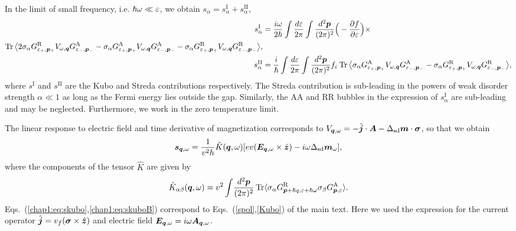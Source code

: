 In the limit of small frequency, i.e. $\hslash\omega\ll\varepsilon$, we obtain $s_\alpha = s^\text{I}_\alpha+s^\text{II}_\alpha$,
\begin{align}
    s^\text{I}_\alpha&=\frac{i\omega}{2\hslash}\int\frac{d\varepsilon}{2\pi}\int \frac{d^2\boldsymbol{p}}{(2\pi)^2}\Big(-\frac{\partial f}{\partial \varepsilon}\Big)\times\nonumber\\
    \operatorname{Tr}\big\langle
    2\sigma_\alpha G^\text{R}_{\varepsilon_+,\boldsymbol{p}_+} V_{\omega,\boldsymbol{q}} G^\text{A}_{\varepsilon_-,\boldsymbol{p}_-}-\sigma_\alpha G^\text{A}_{\varepsilon_+,\boldsymbol{p}_+} V_{\omega,\boldsymbol{q}} G^\text{A}_{\varepsilon_-,\boldsymbol{p}_-} \nonumber
    -\sigma_\alpha G^\text{R}_{\varepsilon_+,\boldsymbol{p}_+} V_{\omega,\boldsymbol{q}} G^\text{R}_{\varepsilon_-,\boldsymbol{p}_-}\big\rangle,\\
    s^\text{II}_\alpha&=\frac{i}{\hslash}\int\frac{d\varepsilon}{2\pi}\int \frac{d^2\boldsymbol{p}}{(2\pi)^2} f_\varepsilon
     \operatorname{Tr} \big\langle\sigma_\alpha
    G^\text{A}_{\varepsilon_+,\boldsymbol{p}_+} V_{\omega,\boldsymbol{q}} G^\text{A}_{\varepsilon_-,\boldsymbol{p}_-}-
    \sigma_\alpha G^\text{R}_{\varepsilon_+,\boldsymbol{p}_+} V_{\omega,\boldsymbol{q}} G^\text{R}_{\varepsilon_-,\boldsymbol{p}_-}\big\rangle,
\end{align}
where $s^{\text{I}}$ and $s^\text{II}$ are the Kubo and Streda contributions respectively. The Streda contribution is sub-leading in the powers of weak disorder strength $\alpha\ll 1$ as long as the Fermi energy lies outside the gap. Similarly, the AA and RR bubbles in the expression of $s_\alpha^\text{I}$ are sub-leading and may be neglected. Furthermore, we work in the zero temperature limit. 

The linear response to electric field and time derivative of magnetization corresponds to $V_{\boldsymbol{q},\omega} = -\hat{\boldsymbol{j}}
\cdot\boldsymbol{A}-\Delta_\text{sd} \boldsymbol{m}\cdot\boldsymbol{\sigma}$, so that we obtain
\begin{equation}
  \boldsymbol{s}_{\boldsymbol{q},\omega}=\frac{1}{v^2h}\hat{K}(\boldsymbol{q},\omega)[ev(\boldsymbol{E}_{\boldsymbol{q},\omega}\times\hat{\boldsymbol{z}})-i\omega\Delta_{\text{sd}}\boldsymbol{m}_{\omega}],
  \label{chap1:eq:skubo}
\end{equation}
where the components of the tensor $\hat{K}$ are given by
\begin{equation}
\hat{K}_{\alpha\beta}(\boldsymbol{q},\omega)={v^2}\int\!\frac{d^2\boldsymbol{p}}{(2\pi)^2}\operatorname{Tr} \langle \sigma_\alpha G^\text{R}_{\boldsymbol{p}+ \hslash q,\varepsilon+\hslash\omega}\sigma_\beta G^\text{A}_{\boldsymbol{p},\varepsilon}\rangle.
\label{chap1:eq:skuboB}
\end{equation}
Eqs.~(\ref{chap1:eq:skubo},\ref{chap1:eq:skuboB}) correspond to Eqs.~(\ref{spol},\ref{Kubo}) of the main text. Here we used the expression for the current operator $\hat{\boldsymbol{j}} = v_f(\boldsymbol{\sigma}\times\hat{\boldsymbol{z}})$ and electric field $\boldsymbol{E}_{\boldsymbol{q},\omega}=i\omega \boldsymbol{A}_{\boldsymbol{q},\omega}$.

